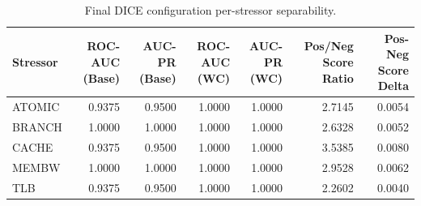 \begin{table}[t]
\centering
\caption{Final DICE configuration per-stressor separability.}
\label{tab:dice_full_stressor}
\footnotesize
\begin{tabular}{lrrrrrr}
\toprule
Stressor & ROC-AUC (Base) & AUC-PR (Base) & ROC-AUC (WC) & AUC-PR (WC) & Pos/Neg Score Ratio & Pos-Neg Score Delta \\
\midrule
ATOMIC & 0.9375 & 0.9500 & 1.0000 & 1.0000 & 2.7145 & 0.0054 \\
BRANCH & 1.0000 & 1.0000 & 1.0000 & 1.0000 & 2.6328 & 0.0052 \\
CACHE & 0.9375 & 0.9500 & 1.0000 & 1.0000 & 3.5385 & 0.0080 \\
MEMBW & 1.0000 & 1.0000 & 1.0000 & 1.0000 & 2.9528 & 0.0062 \\
TLB & 0.9375 & 0.9500 & 1.0000 & 1.0000 & 2.2602 & 0.0040 \\
\bottomrule
\end{tabular}

\end{table}
